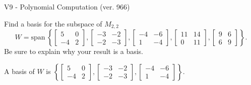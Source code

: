 \begin{exercise}
  \begin{exerciseTitle}V9 - Polynomial Computation (ver. 966)\end{exerciseTitle}
  \begin{exerciseStatement}
    Find a basis for the subspace of \(M_{2,2}\) 
\[W=\mathrm{span}\ \left\{\left[\begin{array}{cc}
5 & 0 \\
-4 & 2
\end{array}\right] , \left[\begin{array}{cc}
-3 & -2 \\
-2 & -3
\end{array}\right] , \left[\begin{array}{cc}
-4 & -6 \\
1 & -4
\end{array}\right] , \left[\begin{array}{cc}
11 & 14 \\
0 & 11
\end{array}\right] , \left[\begin{array}{cc}
9 & 6 \\
6 & 9
\end{array}\right]\right\}.\]
 Be sure to explain why your result is a basis.


  \end{exerciseStatement}
  \begin{exerciseAnswer}
   A basis of \(W\) is  \(\left\{\left[\begin{array}{cc}
5 & 0 \\
-4 & 2
\end{array}\right] , \left[\begin{array}{cc}
-3 & -2 \\
-2 & -3
\end{array}\right] , \left[\begin{array}{cc}
-4 & -6 \\
1 & -4
\end{array}\right]\right\}\).
  


  \end{exerciseAnswer}
\end{exercise}